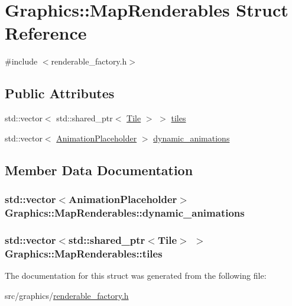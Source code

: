 \hypertarget{struct_graphics_1_1_map_renderables}{}\section{Graphics\+:\+:Map\+Renderables Struct Reference}
\label{struct_graphics_1_1_map_renderables}


{\ttfamily \#include $<$renderable\+\_\+factory.\+h$>$}

\subsection*{Public Attributes}
\begin{DoxyCompactItemize}
\item 
std\+::vector$<$ std\+::shared\+\_\+ptr$<$ \hyperlink{class_graphics_1_1_tile}{Tile} $>$ $>$ \hyperlink{struct_graphics_1_1_map_renderables_a6d34f842301b1673f8ec1b1637fa3972}{tiles}
\item 
std\+::vector$<$ \hyperlink{struct_graphics_1_1_animation_placeholder}{Animation\+Placeholder} $>$ \hyperlink{struct_graphics_1_1_map_renderables_a2cd42b457d91d533eb005154ade17687}{dynamic\+\_\+animations}
\end{DoxyCompactItemize}


\subsection{Member Data Documentation}
\hypertarget{struct_graphics_1_1_map_renderables_a2cd42b457d91d533eb005154ade17687}{}
\subsubsection[{dynamic\+\_\+animations}]{\setlength{\rightskip}{0pt plus 5cm}std\+::vector$<${\bf Animation\+Placeholder}$>$ Graphics\+::\+Map\+Renderables\+::dynamic\+\_\+animations}\label{struct_graphics_1_1_map_renderables_a2cd42b457d91d533eb005154ade17687}
\hypertarget{struct_graphics_1_1_map_renderables_a6d34f842301b1673f8ec1b1637fa3972}{}
\subsubsection[{tiles}]{\setlength{\rightskip}{0pt plus 5cm}std\+::vector$<$std\+::shared\+\_\+ptr$<${\bf Tile}$>$ $>$ Graphics\+::\+Map\+Renderables\+::tiles}\label{struct_graphics_1_1_map_renderables_a6d34f842301b1673f8ec1b1637fa3972}


The documentation for this struct was generated from the following file\+:\begin{DoxyCompactItemize}
\item 
src/graphics/\hyperlink{renderable__factory_8h}{renderable\+\_\+factory.\+h}\end{DoxyCompactItemize}
